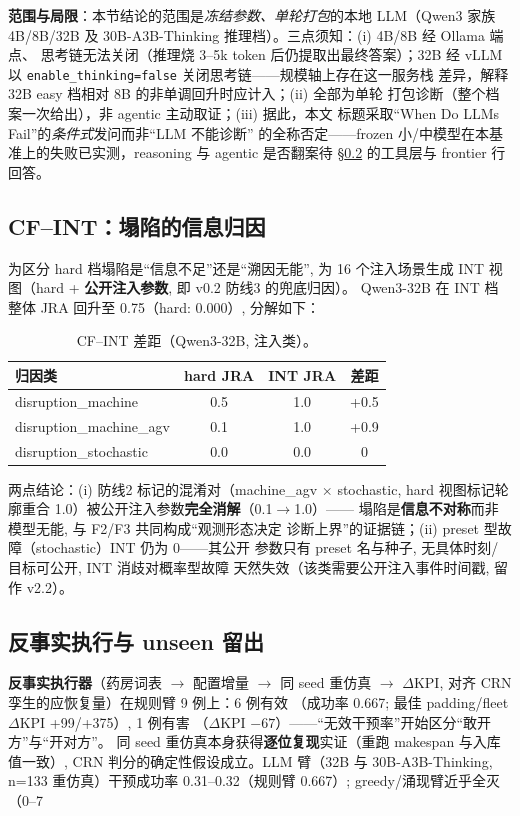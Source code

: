 \documentclass[UTF8,12pt,a4paper]{ctexart}
\begin{document}
\textbf{范围与局限}：本节结论的范围是\emph{冻结参数、单轮打包}的本地
LLM（Qwen3 家族 4B/8B/32B 及 30B-A3B-Thinking 推理档）。三点须知：(i) 4B/8B 经 Ollama 端点、
思考链无法关闭（推理烧 3--5k token 后仍提取出最终答案）；32B 经 vLLM
以 \texttt{enable\_thinking=false} 关闭思考链——规模轴上存在这一服务栈
差异，解释 32B easy 档相对 8B 的非单调回升时应计入；(ii) 全部为单轮
打包诊断（整个档案一次给出），非 agentic 主动取证；(iii) 据此，本文
标题采取``When Do LLMs Fail''的\emph{条件式}发问而非``LLM 不能诊断''
的全称否定——frozen 小/中模型在本基准上的失败已实测，reasoning 与
agentic 是否翻案待 §\ref{sec:cfb} 的工具层与 frontier 行回答。

\subsection{CF--INT：塌陷的信息归因}\label{sec:cfint}

为区分 hard 档塌陷是``信息不足''还是``溯因无能'', 为 16 个注入场景生成
INT 视图（hard + \textbf{公开注入参数}, 即 v0.2 防线3 的兜底归因）。
Qwen3-32B 在 INT 档整体 JRA 回升至 0.75（hard: 0.000）, 分解如下：

\begin{table}[h]\centering\small
\begin{tabular}{lccc}
\toprule
归因类 & hard JRA & INT JRA & 差距\\
\midrule
disruption\_machine & 0.5 & 1.0 & +0.5\\
disruption\_machine\_agv & 0.1 & 1.0 & +0.9\\
disruption\_stochastic & 0.0 & 0.0 & 0\\
\bottomrule
\end{tabular}
\caption{CF--INT 差距（Qwen3-32B, 注入类）。}\label{tab:cfint}
\end{table}

两点结论：(i) 防线2 标记的混淆对（machine\_agv $\times$ stochastic, hard
视图标记轮廓重合 1.0）被公开注入参数\textbf{完全消解}（0.1$\to$1.0）——
塌陷是\textbf{信息不对称}而非模型无能, 与 F2/F3 共同构成``观测形态决定
诊断上界''的证据链；(ii) preset 型故障（stochastic）INT 仍为 0——其公开
参数只有 preset 名与种子, 无具体时刻/目标可公开, INT 消歧对概率型故障
天然失效（该类需要公开注入事件时间戳, 留作 v2.2）。

\subsection{反事实执行与 unseen 留出}\label{sec:cfb}

\textbf{反事实执行器}（药房词表 $\to$ 配置增量 $\to$ 同 seed 重仿真 $\to$
$\Delta$KPI, 对齐 CRN 孪生的应恢复量）在规则臂 9 例上：6 例有效
（成功率 0.667; 最佳 padding/fleet $\Delta$KPI +99/+375）, 1 例有害
（$\Delta$KPI $-67$）——``无效干预率''开始区分``敢开方''与``开对方''。
同 seed 重仿真本身获得\textbf{逐位复现}实证（重跑 makespan 与入库值一致）,
CRN 判分的确定性假设成立。LLM 臂（32B 与 30B-A3B-Thinking, n=133 重仿真）干预成功率 0.31--0.32（规则臂 0.667）; greedy/涌现臂近乎全灭（0--7%
\end{document}
